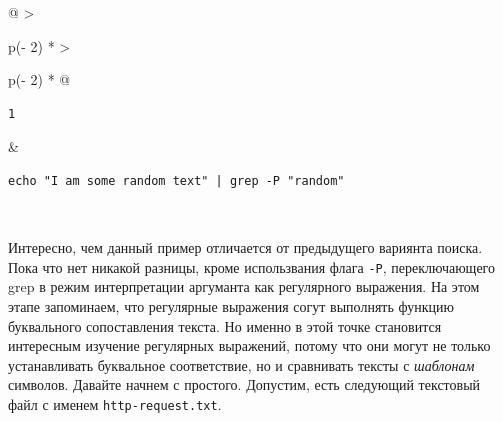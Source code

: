 \documentclass{report}
\begin{document}
\begin{longtable}[]{@{}
  >{\raggedright\arraybackslash}p{(\columnwidth - 2\tabcolsep) * }
  >{\raggedright\arraybackslash}p{(\columnwidth - 2\tabcolsep) * }@{}}
\toprule
\endhead
\begin{minipage}[t]{\linewidth}\raggedright
\begin{verbatim}
1
\end{verbatim}
\end{minipage} & \begin{minipage}[t]{\linewidth}\raggedright
\begin{verbatim}
echo "I am some random text" | grep -P "random"
\end{verbatim}
\end{minipage} \\ \addlinespace
\bottomrule
\end{longtable}

Интересно, чем данный пример отличается от предыдущего вариянта поиска.
Пока что нет никакой разницы, кроме использвания флага \texttt{-P},
переключающего grep в режим интерпретации аргуманта как регулярного
выражения. На этом этапе запоминаем, что регулярные выражения согут
выполнять функцию буквального сопоставления текста. Но именно в этой
точке становится интересным изучение регулярных выражений, потому что
они могут не только устанавливать буквальное соответствие, но и
сравнивать тексты с \emph{шаблонам} символов. Давайте начнем с простого.
Допустим, есть следующий текстовый файл с именем
\texttt{http-request.txt}.
\end{document}
